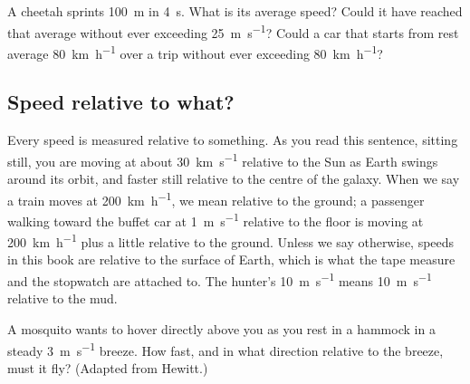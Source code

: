 \begin{checkbox}
A cheetah sprints \SI{100}{\metre} in \SI{4}{\second}. What is its average speed? Could it have reached that average without ever exceeding \SI{25}{\metre\per\second}? Could a car that starts from rest average \SI{80}{\kilo\metre\per\hour} over a trip without ever exceeding \SI{80}{\kilo\metre\per\hour}?
\end{checkbox}

\subsection{Speed relative to what?}

Every speed is measured relative to something. As you read this sentence, sitting still, you are moving at about \SI{30}{\kilo\metre\per\second} relative to the Sun as Earth swings around its orbit, and faster still relative to the centre of the galaxy. When we say a train moves at \SI{200}{\kilo\metre\per\hour}, we mean relative to the ground; a passenger walking toward the buffet car at \SI{1}{\metre\per\second} relative to the floor is moving at \SI{200}{\kilo\metre\per\hour} plus a little relative to the ground. Unless we say otherwise, speeds in this book are relative to the surface of Earth, which is what the tape measure and the stopwatch are attached to. The hunter's \SI{10}{\metre\per\second} means \SI{10}{\metre\per\second} relative to the mud.

\begin{checkbox}
A mosquito wants to hover directly above you as you rest in a hammock in a steady \SI{3}{\metre\per\second} breeze. How fast, and in what direction relative to the breeze, must it fly? (Adapted from Hewitt.)
\end{checkbox}
